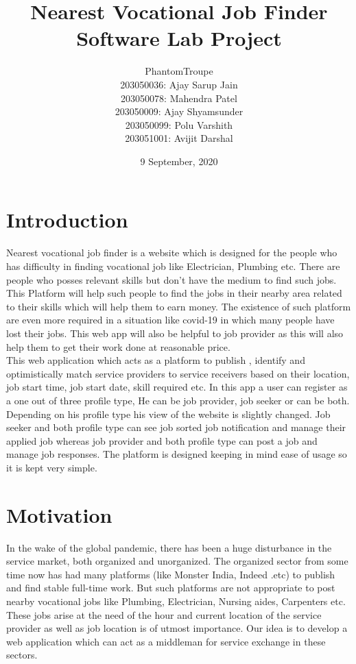 \documentclass[a4paper 12pt]{article}
\title{\vspace{50mm}\textbf{\huge Nearest Vocational Job Finder \\ \huge Software Lab Project}}
\author{\LARGE PhantomTroupe \\ [1ex]
\normalsize 203050036: Ajay Sarup Jain\\
\normalsize 203050078: Mahendra Patel\\
\normalsize 203050009: Ajay Shyamsunder\\
\normalsize 203050099: Polu Varshith\\
\normalsize 203051001: Avijit Darshal}
\date{\Large 9 September, 2020}
\begin{document}
\maketitle
\thispagestyle{empty}
\clearpage
{} 
\newpage
\tableofcontents
\newpage
\section{\textbf{Introduction}}
Nearest vocational job finder is a website which is designed for the people who has difficulty in finding vocational job like Electrician, Plumbing etc. There are people who posses relevant skills but don't have the medium to find such jobs. This Platform will help such people to find the jobs in their nearby area related to their skills which will help them to earn money. The existence of such platform are even more required in a situation like covid-19 in which many people have lost their jobs. This web app will also be helpful to job provider as this will also help them to get their work done at reasonable price.\\

This web application which acts as a platform to publish , identify and optimistically match service providers to service receivers based on their location, job start time, job start date, skill required etc. In this app a user can register as a one out of three profile type, He can be job provider, job seeker or can be both. Depending on his profile type his view of the website is slightly changed. Job seeker and both profile type can see job sorted job notification and manage their applied job  whereas job provider and both profile type can post a job and manage job responses. The platform is designed keeping in mind ease of usage so it is kept very simple.\\

\newcommand{\latex}{\LaTeX\xspace}


 \section{\textbf{Motivation}}
In the wake of the global pandemic, there has been a huge disturbance in the service market, both organized and unorganized. The organized sector from some time now has had many platforms (like Monster India, Indeed .etc) to publish and find stable full-time work. But such platforms are not appropriate to post nearby vocational jobs like Plumbing, Electrician, Nursing aides, Carpenters etc. These jobs arise at the need of the hour and current location of the service provider as well as job location is of utmost importance. Our idea is to develop a web application which can act as a middleman for service exchange in these sectors. 
\end{document}
